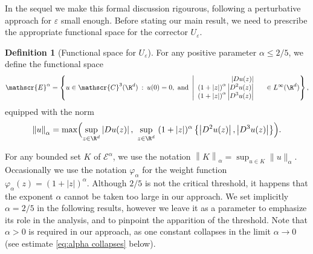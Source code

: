 \documentclass[JEP,XML,SOM,Unicode]{cedram}
\let\mathcal\mathscr
\newcommand{\cC}{\mathcal{C}}
\theoremstyle{plain}
\theoremstyle{definition}
\newtheorem{definition}[thm]{Definition}
\let\eps\varepsilon
\let\ds\displaystyle
\newcommand{\abs}[1]{\left\lvert#1\right\rvert}
\newcommand{\nalph}[1]{\left\lVert#1\right\rVert_\alpha}
\newcommand{\Ea}{\mathcal{E}^\alpha}
\newcommand{\vphia}{\varphi_\alpha}
\begin{document}
In the sequel we make this formal discussion rigourous, following a perturbative approach for $\eps$ small enough. Before stating our main result, we need to prescribe the appropriate functional space for the corrector $U_\eps$.

\begin{definition}[Functional space for $U_\eps$]\label{def:Ea}
For any positive parameter 	$\alpha \leq 2/5$, we define the functional space \begin{equation*}
\Ea =\left\{
u \in \cC^3(\R^d)\::\: u(0)=0, \text{ and } \left|
\begin{array}{rr} \ds \abs{ D u(z)} & \\
\ds \left(1+|z| \right) ^\alpha \abs{ D^2 u(z) }& \\
\ds \left(1+|z| \right) ^\alpha \abs{ D^3 u(z) }& \\
\end{array} \right. \in L^\infty(\R^d)
\right\},
\end{equation*}
equipped with the norm
\begin{equation}\label{eq:normalpha}
\nalph{u} = \max \Bigl(\sup_{z \in \R^d} \abs{D u(z) }, \ \sup_{z \in \R^d} \ (1+\abs{z})^\alpha \left\{\abs{ D^2 u(z) }, \abs{ D^3 u(z) } \right\} \Bigr).
\end{equation}
\end{definition}
For any bounded set $K$ of $\Ea$, we use the notation $\nalph{K} = \sup_{u\in K} \|u\|_\alpha$. Occasionally we use the notation $\vphia$ for the weight function $\vphia(z) = (1+\abs{z})^\alpha$. Although $2/5$ is not the critical threshold, it happens that the exponent $\alpha$ cannot be taken too large in our approach. We set implicitly $\alpha = 2/5$ in the following results, however we leave it as a parameter to emphasize its role in the analysis, and to pinpoint the apparition of the threshold. Note that $\alpha>0$ is required in our approach, as one constant collapses in the limit $\alpha\to 0$ (see estimate \eqref{eq:alpha collapses} below).
\end{document}
